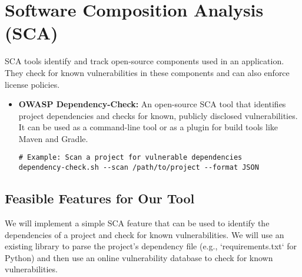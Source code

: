 \section{Software Composition Analysis (SCA)}
SCA tools identify and track open-source components used in an application. They check for known vulnerabilities in these components and can also enforce license policies.

\begin{itemize}
    \item \textbf{OWASP Dependency-Check:} An open-source SCA tool that identifies project dependencies and checks for known, publicly disclosed vulnerabilities. It can be used as a command-line tool or as a plugin for build tools like Maven and Gradle.
    \begin{verbatim}
# Example: Scan a project for vulnerable dependencies
dependency-check.sh --scan /path/to/project --format JSON
    \end{verbatim}
\end{itemize}

\subsection{Feasible Features for Our Tool}
We will implement a simple SCA feature that can be used to identify the dependencies of a project and check for known vulnerabilities. We will use an existing library to parse the project's dependency file (e.g., `requirements.txt` for Python) and then use an online vulnerability database to check for known vulnerabilities.
